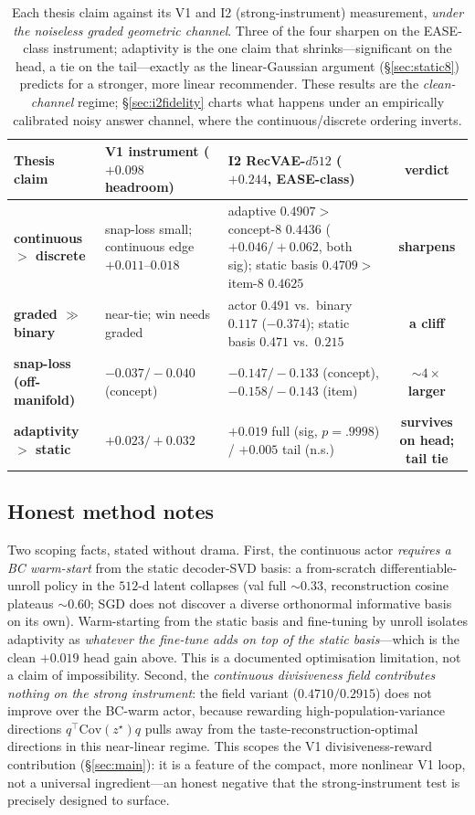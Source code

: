 \documentclass[11pt]{article}
\begin{document}
\begin{table}[h]\centering
\small
\begin{tabular}{p{3.6cm}p{4.7cm}p{4.7cm}c}
\toprule
Thesis claim & V1 instrument ($+0.098$ headroom) & I2 RecVAE-$d512$ ($+0.244$, EASE-class) & verdict \\
\midrule
\textbf{continuous $>$ discrete} & snap-loss small; continuous edge $+0.011$--$0.018$ & adaptive $0.4907 >$ concept-8 $0.4436$ ($+0.046/+0.062$, both sig); static basis $0.4709 >$ item-8 $0.4625$ & \textbf{sharpens} \\
\textbf{graded $\gg$ binary} & near-tie; win needs graded & actor $0.491$ vs.\ binary $0.117$ ($-0.374$); static basis $0.471$ vs.\ $0.215$ & \textbf{a cliff} \\
\textbf{snap-loss (off-manifold)} & $-0.037/-0.040$ (concept) & $-0.147/-0.133$ (concept), $-0.158/-0.143$ (item) & \textbf{${\sim}4\times$ larger} \\
\textbf{adaptivity $>$ static} & $+0.023/+0.032$ & $+0.019$ full (sig, $p{=}.9998$) / $+0.005$ tail (n.s.) & \textbf{survives on head; tail tie} \\
\bottomrule
\end{tabular}
\caption{Each thesis claim against its V1 and I2 (strong-instrument) measurement, \emph{under the noiseless graded
geometric channel}. Three of the four sharpen on the EASE-class instrument; adaptivity is the one claim that
shrinks---significant on the head, a tie on the tail---exactly as the linear-Gaussian argument (\S\ref{sec:static8})
predicts for a stronger, more linear recommender. These results are the \emph{clean-channel} regime; \S\ref{sec:i2fidelity}
charts what happens under an empirically calibrated noisy answer channel, where the continuous/discrete ordering
inverts.}\label{tab:i2verdict}
\end{table}

\subsection{Honest method notes}\label{sec:i2notes}
Two scoping facts, stated without drama. First, the continuous actor \emph{requires a BC warm-start} from the static
decoder-SVD basis: a from-scratch differentiable-unroll policy in the $512$-d latent collapses (val full ${\sim}0.33$,
reconstruction cosine plateaus ${\sim}0.60$; SGD does not discover a diverse orthonormal informative basis on its own).
Warm-starting from the static basis and fine-tuning by unroll isolates adaptivity as \emph{whatever the fine-tune adds on
top of the static basis}---which is the clean $+0.019$ head gain above. This is a documented optimisation limitation, not
a claim of impossibility. Second, the \emph{continuous divisiveness field contributes nothing on the strong instrument}:
the field variant ($0.4710/0.2915$) does not improve over the BC-warm actor, because rewarding high-population-variance
directions $q^\top\!\mathrm{Cov}(z^\star)q$ pulls away from the taste-reconstruction-optimal directions in this
near-linear regime. This scopes the V1 divisiveness-reward contribution (\S\ref{sec:main}): it is a feature of the
compact, more nonlinear V1 loop, not a universal ingredient---an honest negative that the strong-instrument test is
precisely designed to surface.
\end{document}
